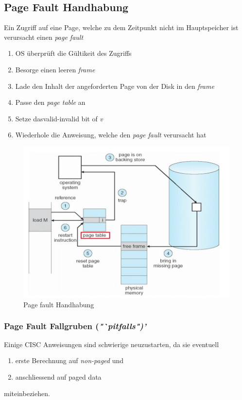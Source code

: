 \documentclass[a4paper]{scrreprt}
\begin{document}
\subsection{Page Fault Handhabung}

Ein Zugriff auf eine Page, welche zu dem Zeitpunkt nicht im Hauptspeicher ist verursacht einen \textit{page fault}

\begin{enumerate}
\item OS überprüft die Gültikeit des Zugriffs
\item Besorge einen leeren \textit{frame}
\item Lade den Inhalt der angeforderten Page von der Disk in den \textit{frame}
\item Passe den \textit{page table} an
\item Setze dasvalid-invalid bit of \textit{v}
\item Wiederhole die Anweisung, welche den \textit{page fault} verursacht hat
\end{enumerate}

\begin{figure}[ht]
\centering
\includegraphics[scale=0.5]{graphics/pagefaulthandling.png}
\caption{Page fault Handhabung}
\end{figure}

\subsubsection{Page Fault Fallgruben (\textit{"`pitfalls")'}}

Einige CISC Anweisungen sind schwierige neuzustarten, da sie eventuell
\begin{enumerate}
\item erste Berechnung auf \textit{non-paged} und
\item anschliessend auf paged data
\end{enumerate}
miteinbeziehen.
\end{document}
